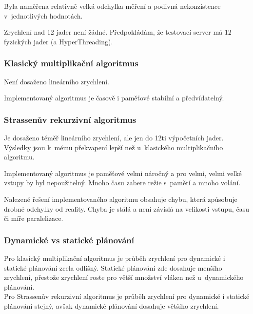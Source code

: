 \documentclass[12pt,a4paper]{article}
\begin{document}
Byla naměřena relativně velká odchylka měření a podivná nekonzistence v~jednotlivých hodnotách. 
\bigskip

Zrychlení nad 12 jader není žádné. Předpokládám, že testovací server má 12 fyzických jader (a HyperThreading).

\subsubsection{Klasický multiplikační algoritmus}

Není dosaženo lineárního zrychlení.
\bigskip

Implementovaný algoritmus je časově i paměťové stabilní a předvídatelný.


\subsubsection{Strassenův rekurzivní algoritmus}

Je dosaženo téměř lineárního zrychlení, ale jen do 12ti výpočetních jader. Výsledky jsou k~mému překvapení lepší než u~klasického multiplikačního algoritmu.
\bigskip

Implementovaný algoritmus je paměťové velmi náročný a pro velmi, velmi velké vstupy by byl nepoužitelný. Mnoho času zabere režie s~pamětí a mnoho volání.
\bigskip

Nalezené řešení implementovaného algoritmu obsahuje chybu, která způsobuje drobné odchylky od reality. Chyba je stálá a není závislá na velikosti vstupu, času či míře paralelizace.

\subsubsection{Dynamické vs statické plánování}


Pro klasický multiplikační algoritmus je průběh zrychlení pro dynamické i statické plánování zcela odlišný. Statické plánování zde dosahuje menšího zrychlení, přestože zrychlení roste pro větší množství vláken než u~dynamického plánování. \\


Pro Strassenův rekurzivní algoritmus je průběh zrychlení pro dynamické i statické plánování stejný, avšak dynamické plánování dosahuje většího zrychlení.


%
\end{document}

